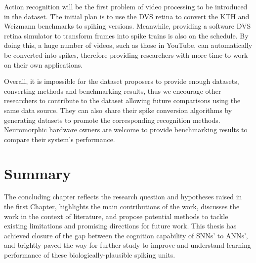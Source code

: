 Action recognition will be the first problem of video processing to be introduced in the dataset.
The initial plan is to use the DVS retina to convert the KTH and Weizmann benchmarks to spiking versions.
Meanwhile, providing a software DVS retina simulator to transform frames into spike trains is also on the schedule.
By doing this, a huge number of videos, such as those in YouTube, can automatically be converted into spikes, therefore providing researchers with more time to work on their own applications.

Overall, it is impossible for the dataset proposers to provide enough datasets, converting methods and benchmarking results, thus we encourage other researchers to contribute to the dataset allowing future comparisons using the same data source.
They can also share their spike conversion algorithms by generating datasets to promote the corresponding recognition methods.
Neuromorphic hardware owners are welcome to provide benchmarking results to compare their system's performance.
\section{Summary}

The concluding chapter reflects the research question and hypotheses raised in the first Chapter, highlights the main contributions of the work, discusses the work in the context of literature, and propose potential methods to tackle existing limitations and promising directions for future work.
This thesis has achieved closure of the gap between the cognition capability of SNNs' to ANNs', and brightly paved the way for further study to improve and understand learning performance of these biologically-plausible spiking units.